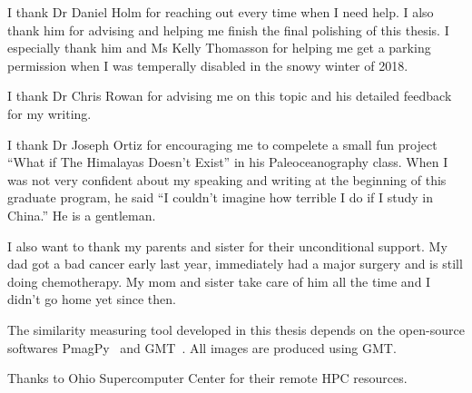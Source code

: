 \begin{acknowledgements}

I thank Dr Daniel Holm for reaching out every time when I need help. I also
  thank him for advising and helping me finish the final polishing of this
  thesis. I especially thank him and Ms Kelly Thomasson for helping me get a
  parking permission when I was temperally disabled in the snowy winter of 2018.

I thank Dr Chris Rowan for advising me on this topic and his detailed feedback
  for my writing.

I thank Dr Joseph Ortiz for encouraging me to compelete a small fun project
  ``What if The Himalayas Doesn't Exist'' in his Paleoceanography class. When I
  was not very confident about my speaking and writing at the beginning of this
  graduate program, he said ``I couldn't imagine how terrible I do if I study in
  China.'' He is a gentleman.

I also want to thank my parents and sister for their unconditional support. My
  dad got a bad cancer early last year, immediately had a major surgery and is
  still doing chemotherapy. My mom and sister take care of him all the time and
  I didn't go home yet since then.

The similarity measuring tool developed in this thesis depends on the
  open-source softwares PmagPy~\citep{T16} and GMT~\citep{W13}. All images are
  produced using GMT\@.

Thanks to Ohio Supercomputer Center for their remote HPC resources.

\end{acknowledgements}
